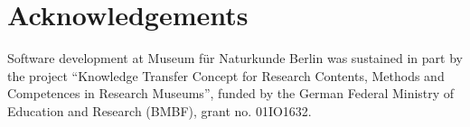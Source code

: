 \documentclass[fleqn,10pt,lineno]{wlpeerj} %
\begin{document}
\section{Acknowledgements}
Software development at Museum für Naturkunde Berlin was sustained in part by the project ``Knowledge Transfer Concept for Research Contents, Methods and Competences in Research Museums'', funded by the German Federal Ministry of Education and Research (BMBF), grant no. 01IO1632.


\end{document}

